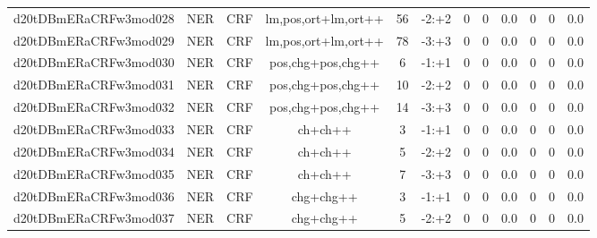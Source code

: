 \documentclass[a4paper]{article}
\begin{document}
\begin{landscape}
\begin{center}
\begin{tabular}{ |c|c|c|c|c|c|c|c|c|c|c|c|}
 
 	
 	\small{ d20tDBmERaCRFw3mod028 } & \small{ NER} & \small{  CRF }  & lm,pos,ort+lm,ort++  &  56 &  \small{  -2:+2 }  &  0 & 0 & 0.0  &  0 & 0 & 0.0 \\
 	

 
 	
 	\small{ d20tDBmERaCRFw3mod029 } & \small{ NER} & \small{  CRF }  & lm,pos,ort+lm,ort++  &  78 &  \small{  -3:+3 }  &  0 & 0 & 0.0  &  0 & 0 & 0.0 \\
 	

 
 	
 	\small{ d20tDBmERaCRFw3mod030 } & \small{ NER} & \small{  CRF }  & pos,chg+pos,chg++  &  6 &  \small{  -1:+1 }  &  0 & 0 & 0.0  &  0 & 0 & 0.0 \\
 	

 
 	
 	\small{ d20tDBmERaCRFw3mod031 } & \small{ NER} & \small{  CRF }  & pos,chg+pos,chg++  &  10 &  \small{  -2:+2 }  &  0 & 0 & 0.0  &  0 & 0 & 0.0 \\
 	

 
 	
 	\small{ d20tDBmERaCRFw3mod032 } & \small{ NER} & \small{  CRF }  & pos,chg+pos,chg++  &  14 &  \small{  -3:+3 }  &  0 & 0 & 0.0  &  0 & 0 & 0.0 \\
 	

 
 	
 	\small{ d20tDBmERaCRFw3mod033 } & \small{ NER} & \small{  CRF }  & ch+ch++  &  3 &  \small{  -1:+1 }  &  0 & 0 & 0.0  &  0 & 0 & 0.0 \\
 	

 
 	
 	\small{ d20tDBmERaCRFw3mod034 } & \small{ NER} & \small{  CRF }  & ch+ch++  &  5 &  \small{  -2:+2 }  &  0 & 0 & 0.0  &  0 & 0 & 0.0 \\
 	

 
 	
 	\small{ d20tDBmERaCRFw3mod035 } & \small{ NER} & \small{  CRF }  & ch+ch++  &  7 &  \small{  -3:+3 }  &  0 & 0 & 0.0  &  0 & 0 & 0.0 \\
 	

 
 	
 	\small{ d20tDBmERaCRFw3mod036 } & \small{ NER} & \small{  CRF }  & chg+chg++  &  3 &  \small{  -1:+1 }  &  0 & 0 & 0.0  &  0 & 0 & 0.0 \\
 	

 
 	
 	\small{ d20tDBmERaCRFw3mod037 } & \small{ NER} & \small{  CRF }  & chg+chg++  &  5 &  \small{  -2:+2 }  &  0 & 0 & 0.0  &  0 & 0 & 0.0 \\
 	


\end{tabular}
\end{center}
\end{landscape}
\end{document}
